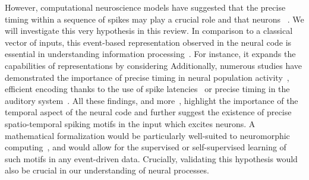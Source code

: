 \documentclass[brainsci, %
               review,accept,pdftex,moreauthors
               ]{Definitions/mdpi}
\begin{document}
However, computational neuroscience models have suggested that the precise timing within a sequence of spikes may play a crucial role and that neurons ~\citep{abeles_role_1982}.  We will investigate this very hypothesis in this review. %
In comparison to a classical  vector of inputs, this event-based representation observed in the neural code is essential in understanding information processing~\citep{carr_processing_1993}. For instance, it expands the capabilities of representations  by considering   Additionally, numerous studies have demonstrated the importance of precise timing in neural population activity~\citep{davis_spontaneous_2021}, efficient encoding thanks to the use of spike latencies~\citep{perrinet_coding_2004,gollisch_rapid_2008} or precise timing in the auditory system~\citep{deweese_binary_2003,carr_circuit_1990}. All these findings, and more~\citep{bohte_evidence_2004,dilorenzo_spike_2013}, highlight the importance of the temporal aspect of the neural code and further suggest the existence of precise spatio-temporal spiking motifs in the input which excites neurons. A mathematical formalization would be particularly well-suited to neuromorphic computing~\citep{roy_towards_2019}, and would allow for the supervised or self-supervised learning of such motifs in any event-driven data.  Crucially, validating this hypothesis would also be crucial in our understanding of neural processes. %
%
\end{document}
